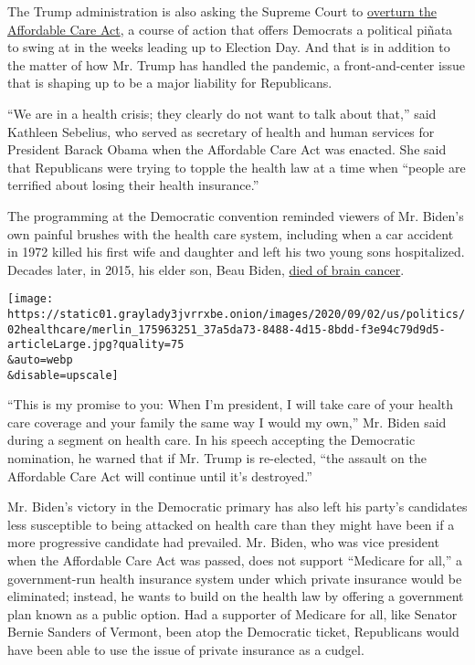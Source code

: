 The Trump administration is also asking the Supreme Court to
\href{https://www.nytimes3xbfgragh.onion/2020/06/26/us/politics/obamacare-trump-administration-supreme-court.html}{overturn
the Affordable Care Act}, a course of action that offers Democrats a
political piñata to swing at in the weeks leading up to Election Day.
And that is in addition to the matter of how Mr. Trump has handled the
pandemic, a front-and-center issue that is shaping up to be a major
liability for Republicans.

``We are in a health crisis; they clearly do not want to talk about
that,'' said Kathleen Sebelius, who served as secretary of health and
human services for President Barack Obama when the Affordable Care Act
was enacted. She said that Republicans were trying to topple the health
law at a time when ``people are terrified about losing their health
insurance.''

The programming at the Democratic convention reminded viewers of Mr.
Biden's own painful brushes with the health care system, including when
a car accident in 1972 killed his first wife and daughter and left his
two young sons hospitalized. Decades later, in 2015, his elder son, Beau
Biden,
\href{https://www.nytimes3xbfgragh.onion/2015/05/31/us/politics/joseph-r-biden-iii-vice-presidents-son-beau-dies-at-46.html}{died
of brain cancer}.

\texttt{[image: https://static01.graylady3jvrrxbe.onion/images/2020/09/02/us/politics/02healthcare/merlin\_175963251\_37a5da73-8488-4d15-8bdd-f3e94c79d9d5-articleLarge.jpg?quality=75\\\&auto=webp\\\&disable=upscale]}

``This is my promise to you: When I'm president, I will take care of
your health care coverage and your family the same way I would my own,''
Mr. Biden said during a segment on health care. In his speech accepting
the Democratic nomination, he warned that if Mr. Trump is re-elected,
``the assault on the Affordable Care Act will continue until it's
destroyed.''

Mr. Biden's victory in the Democratic primary has also left his party's
candidates less susceptible to being attacked on health care than they
might have been if a more progressive candidate had prevailed. Mr.
Biden, who was vice president when the Affordable Care Act was passed,
does not support ``Medicare for all,'' a government-run health insurance
system under which private insurance would be eliminated; instead, he
wants to build on the health law by offering a government plan known as
a public option. Had a supporter of Medicare for all, like Senator
Bernie Sanders of Vermont, been atop the Democratic ticket, Republicans
would have been able to use the issue of private insurance as a cudgel.

